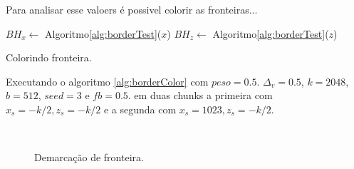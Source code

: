 Para analisar esse valoers é possivel colorir as fronteiras...

\begin{algorithm}[H]\label{alg:borderColor}%
    $BH_{x} \leftarrow$ Algoritmo\ref{alg:borderTest}($x$)\;
    $BH_{z} \leftarrow$ Algoritmo\ref{alg:borderTest}($z$)\;
    
    
    \caption{Colorindo fronteira.}
\end{algorithm}

Executando o algoritmo \ref{alg:borderColor} com $peso = 0.5$. $\Delta_{v} = 0.5$, 
$k = 2048$, $b = 512$, $seed = 3$ e $fb = 0.5$. em duas chunks a primeira com $ x_{s} = -k/2 , z_{s} = -k/2$
e a segunda com $ x_{s} = 1023 , z_{s} = -k/2$.

\begin{figure}[H]
     \centering
     \hspace{0.1cm}
     \\
     \caption{Demarcação de fronteira.}
     
     \label{fig:borderlenanotherauxyeah}
\end{figure}

